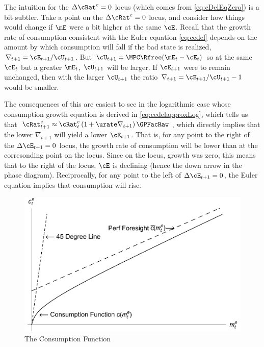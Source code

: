 \documentclass{handout}
\begin{document}

The intuition for the $\Delta {\cRat}^{e}_{\tSS}=0$ locus (which comes from
\eqref{eq:cDelEqZero}) is a bit subtler.  Take a point on 
the $\Delta {\cRat}^{e}_{\tSS}=0$ locus, and consider how things 
would change if $\mE$ were a bit higher at the same $\cE$.  
Recall that the growth rate of consumption consistent with 
the Euler equation \eqref{eq:cedel} depends on the amount by which consumption will
fall if the bad state is realized, $\nabla_{t+1} = \cE_{t+1}/\cU_{t+1}$.  
But $\cU_{t+1} = \MPCU \Rfree (\mE_{t} - \cE_{t})$ so at the same $\cE_{t}$ but 
a greater $\mE_{t}$, $\cU_{t+1}$ will be larger.  If $\cE_{t+1}$ were to remain
unchanged, then with the larger $\cU_{t+1}$ the ratio $\nabla_{t+1} = \cE_{t+1}/\cU_{t+1}-1$ would be smaller.

The consequences of this are easiest to see in the logarithmic case whose consumption growth equation is derived in \eqref{eq:cedelapproxLog}, which tells us that ${\cRat}^{e}_{t+1} \approx {\cRat}^{e}_{t}\left(1+ \urate \nabla _{t+1}\right) {\GPFacRaw}$, which directly 
implies that the lower $\nabla_{t+1}$ will yield a lower $\cE_{t+1}$.  That is, for any point to the right of the $\Delta \cE_{t+1}=0$ locus, the growth rate of consumption will be lower than at the corresonding point on the locus.  Since on the locus, growth
was zero, this means that to the right of the locus, $\cE$ is declining (hence the down arrow in the phase diagram).  Reciprocally, for any point to the left of $\Delta \cE_{t+1}=0$, the Euler equation implies that consumption will rise.


\begin{figure}
\caption{The Consumption Function}\label{fig:cFunc}
\includegraphics[width=6in]{../Figures/TractableBufferStockcFunc}
\end{figure}
\end{document}
